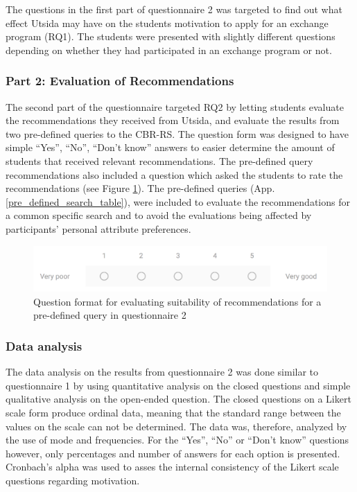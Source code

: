 The questions in the first part of questionnaire 2 was targeted to find out what effect Utsida may have on the students motivation to apply for an exchange program (RQ1). The students were presented with slightly different questions depending on whether they had participated in an exchange program or not.

\subsubsection{Part 2: Evaluation of Recommendations}

The second part of the questionnaire targeted RQ2 by letting students evaluate the recommendations they received from Utsida, and evaluate the results from two pre-defined queries to the CBR-RS. The question form was designed to have simple \enquote{Yes}, \enquote{No}, \enquote{Don't know} answers to easier determine the amount of students that received relevant recommendations. The pre-defined query recommendations also included a question which asked the students to rate the recommendations (see Figure \ref{fig:q2_rate_search}). The pre-defined queries (App. \ref{pre_defined_search_table}), were included to evaluate the recommendations for a common specific search and to avoid the evaluations being affected by participants' personal attribute preferences.

\begin{figure}[H]
    \centering
    \includegraphics[width=1\textwidth]{fig/rate_search.png}
    \caption[Question format for evaluating suitability of recommendations]{Question format for evaluating suitability of recommendations for a pre-defined query in questionnaire 2}
    \label{fig:q2_rate_search}
\end{figure}


\subsubsection{Data analysis}
The data analysis on the results from questionnaire 2 was done similar to questionnaire 1 by using quantitative analysis on the closed questions and simple qualitative analysis on the open-ended question. The closed questions on a Likert scale form produce ordinal data, meaning that the standard range between the values on the scale can not be determined. The data was, therefore, analyzed by the use of mode and frequencies. For the \enquote{Yes}, \enquote{No} or \enquote{Don't know} questions however, only percentages and number of answers for each option is presented. Cronbach's alpha was used to asses the internal consistency of the Likert scale questions regarding motivation. 

